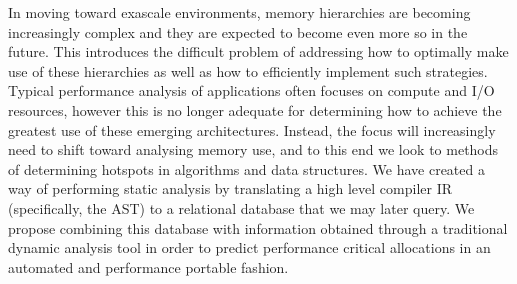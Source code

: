 In moving toward exascale environments, memory hierarchies are becoming increasingly complex and they are expected to become even more so in the future.
This introduces the difficult problem of addressing how to optimally make use of these hierarchies as well as how to efficiently implement such strategies.
Typical performance analysis of applications often focuses on compute and I/O resources, however this is no longer adequate for determining how to achieve the greatest use of these emerging architectures.
Instead, the focus will increasingly need to shift toward analysing memory use, and to this end we look to methods of determining hotspots in algorithms and data structures.
We have created a way of performing static analysis by translating a high level compiler \acl{IR} (specifically, the \acl{AST}) to a relational database that we may later query.
We propose combining this database with information obtained through a traditional dynamic analysis tool in order to predict performance critical allocations in an automated and performance portable fashion.
